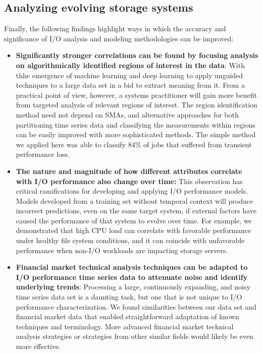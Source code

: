 \subsection{Analyzing evolving storage systems}

Finally, the following findings highlight ways in which the accuracy and significance of I/O analysis and modeling methodologies can be improved:

\begin{itemize}[leftmargin=*]

\item \textbf{Significantly stronger correlations can be found by focusing analysis on algorithmically identified regions of interest in the data}:
With thhe emergence of machine learning and deep learning to apply unguided techniques to a large data set in a bid to extract meaning from it.
From a practical point of view, however, a systems practitioner will gain more benefit from targeted analysis of relevant regions of interest.
The region identification method need not depend on SMAs, and alternative approaches for both partitioning time series data and classifying the measurements within regions can be easily improved with more sophisticated methods.
The simple method we applied here was able to classify 84\% of jobs that suffered from transient performance loss.


\item \textbf{The nature and magnitude of how different attributes correlate with I/O performance also change over time:}
This observation has critical ramifications for developing and applying I/O performance models.
Models developed from a training set without temporal context will produce incorrect predictions, even on the same target system, if
external factors have caused the performance of that system to evolve over time.
For example, we demonstrated that high CPU load can correlate with favorable performance under healthy file system conditions, and it can coincide with unfavorable performance when non-I/O workloads are impacting storage servers.

\item \textbf{Financial market technical analysis techniques can be adapted to I/O performance time series data to attenuate noise and identify underlying trends}:
Processing a large, continuously expanding, and noisy time series data set is a daunting task, but one that is not unique to I/O performance characterization.
We found similarities between our data set and financial market data that enabled straightforward adaptation of known techniques and terminology.
More advanced financial market technical analysis strategies or strategies from other similar fields would likely be even more effective.

\end{itemize}